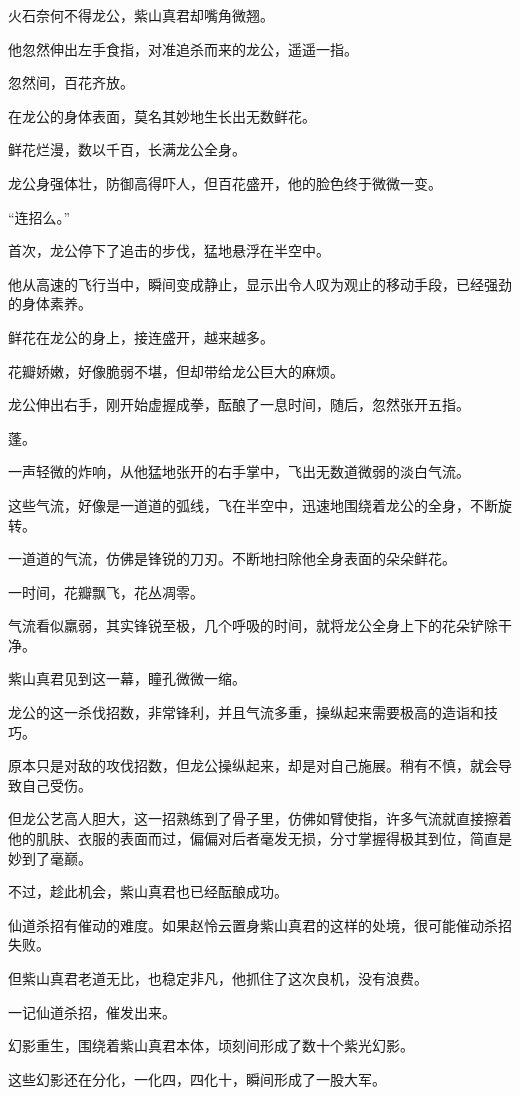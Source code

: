 \begin{this_body}
火石奈何不得龙公，紫山真君却嘴角微翘。

他忽然伸出左手食指，对准追杀而来的龙公，遥遥一指。

忽然间，百花齐放。

在龙公的身体表面，莫名其妙地生长出无数鲜花。

鲜花烂漫，数以千百，长满龙公全身。

龙公身强体壮，防御高得吓人，但百花盛开，他的脸色终于微微一变。

“连招么。”

首次，龙公停下了追击的步伐，猛地悬浮在半空中。

他从高速的飞行当中，瞬间变成静止，显示出令人叹为观止的移动手段，已经强劲的身体素养。

鲜花在龙公的身上，接连盛开，越来越多。

花瓣娇嫩，好像脆弱不堪，但却带给龙公巨大的麻烦。

龙公伸出右手，刚开始虚握成拳，酝酿了一息时间，随后，忽然张开五指。

蓬。

一声轻微的炸响，从他猛地张开的右手掌中，飞出无数道微弱的淡白气流。

这些气流，好像是一道道的弧线，飞在半空中，迅速地围绕着龙公的全身，不断旋转。

一道道的气流，仿佛是锋锐的刀刃。不断地扫除他全身表面的朵朵鲜花。

一时间，花瓣飘飞，花丛凋零。

气流看似羸弱，其实锋锐至极，几个呼吸的时间，就将龙公全身上下的花朵铲除干净。

紫山真君见到这一幕，瞳孔微微一缩。

龙公的这一杀伐招数，非常锋利，并且气流多重，操纵起来需要极高的造诣和技巧。

原本只是对敌的攻伐招数，但龙公操纵起来，却是对自己施展。稍有不慎，就会导致自己受伤。

但龙公艺高人胆大，这一招熟练到了骨子里，仿佛如臂使指，许多气流就直接擦着他的肌肤、衣服的表面而过，偏偏对后者毫发无损，分寸掌握得极其到位，简直是妙到了毫巅。

不过，趁此机会，紫山真君也已经酝酿成功。

仙道杀招有催动的难度。如果赵怜云置身紫山真君的这样的处境，很可能催动杀招失败。

但紫山真君老道无比，也稳定非凡，他抓住了这次良机，没有浪费。

一记仙道杀招，催发出来。

幻影重生，围绕着紫山真君本体，顷刻间形成了数十个紫光幻影。

这些幻影还在分化，一化四，四化十，瞬间形成了一股大军。


\end{this_body}

